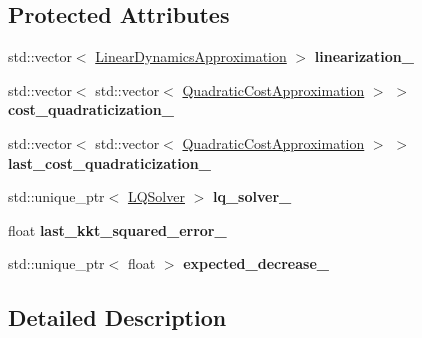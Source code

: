 \subsection*{Protected Attributes}
\begin{DoxyCompactItemize}
\item 
std\+::vector$<$ \hyperlink{structilqgames_1_1_linear_dynamics_approximation}{Linear\+Dynamics\+Approximation} $>$ {\bfseries linearization\+\_\+}\hypertarget{classilqgames_1_1_i_l_q_solver_a8b02b9f196152504e2b4f746704f99a7}{}\label{classilqgames_1_1_i_l_q_solver_a8b02b9f196152504e2b4f746704f99a7}

\item 
std\+::vector$<$ std\+::vector$<$ \hyperlink{structilqgames_1_1_quadratic_cost_approximation}{Quadratic\+Cost\+Approximation} $>$ $>$ {\bfseries cost\+\_\+quadraticization\+\_\+}\hypertarget{classilqgames_1_1_i_l_q_solver_af45202b8baa2630b5a3c47c6bf853005}{}\label{classilqgames_1_1_i_l_q_solver_af45202b8baa2630b5a3c47c6bf853005}

\item 
std\+::vector$<$ std\+::vector$<$ \hyperlink{structilqgames_1_1_quadratic_cost_approximation}{Quadratic\+Cost\+Approximation} $>$ $>$ {\bfseries last\+\_\+cost\+\_\+quadraticization\+\_\+}\hypertarget{classilqgames_1_1_i_l_q_solver_ad23a3a3fc170e9b966c9232b9c9de971}{}\label{classilqgames_1_1_i_l_q_solver_ad23a3a3fc170e9b966c9232b9c9de971}

\item 
std\+::unique\+\_\+ptr$<$ \hyperlink{classilqgames_1_1_l_q_solver}{L\+Q\+Solver} $>$ {\bfseries lq\+\_\+solver\+\_\+}\hypertarget{classilqgames_1_1_i_l_q_solver_afb4b2fed2450e965d347dd6a38a33bb6}{}\label{classilqgames_1_1_i_l_q_solver_afb4b2fed2450e965d347dd6a38a33bb6}

\item 
float {\bfseries last\+\_\+kkt\+\_\+squared\+\_\+error\+\_\+}\hypertarget{classilqgames_1_1_i_l_q_solver_aad3c6e1b11d4c17ff63d87b3755c11b9}{}\label{classilqgames_1_1_i_l_q_solver_aad3c6e1b11d4c17ff63d87b3755c11b9}

\item 
std\+::unique\+\_\+ptr$<$ float $>$ {\bfseries expected\+\_\+decrease\+\_\+}\hypertarget{classilqgames_1_1_i_l_q_solver_a58f9f117f6c03931c46d4ccece3386c7}{}\label{classilqgames_1_1_i_l_q_solver_a58f9f117f6c03931c46d4ccece3386c7}

\end{DoxyCompactItemize}


\subsection{Detailed Description}


